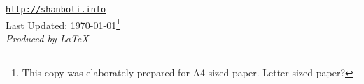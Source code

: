 \vfill
\begin{figure}[h]
\hspace{1.43in}
\end{figure}
\begin{narrow}{0.15in}{1.5in}
\begin{center}
\href{http://shanboli.info}{\tt http://shanboli.info}\\
\vspace{0.15in}
Last Updated: \today\footnote{This copy was elaborately prepared for A4-sized paper. Letter-sized paper?}\\
\vspace{0.15in}
\textit{Produced by \LaTeX}
\end{center}
\end{narrow}
